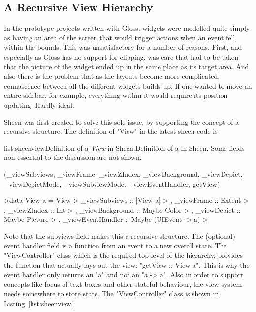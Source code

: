 \subsection{A Recursive View Hierarchy}

In the prototype projects written with Gloss, widgets were modelled quite simply as having an area of the screen that would trigger actions when an event fell within the bounds. This was unsatisfactory  for a number of reasons. First, and especially as Gloss has no support for clipping, was care that had to be taken that the picture of the widget ended up in the same place as its target area. And also there is the problem that as the layouts become more complicated, connascence between all the different widgets builds up. If one wanted to move an entire sidebar, for example, everything within it would require its position updating. Hardly ideal.

Sheen was first created to solve this sole issue, by supporting the concept of a recursive structure. The definition of "View" in the latest sheen code is

\vspace{-0.5em}
\begin{listing}{list:sheenview}{Definition of a \emph{View} in Sheen.}{Definition of a  in Sheen. Some fields non-essential to the discussion are not shown.}{}
\end{listing}\vspace{-1.5em}

\functions(_viewSubviews, _viewFrame, _viewZIndex, _viewBackground, _viewDepict, _viewDepictMode, _viewSubviewMode, _viewEventHandler, getView)
\begin{haskell}

>data View a = View
>  {  _viewSubviews     :: [View a]
>  ,  _viewFrame        :: Extent
>  ,  _viewZIndex       :: Int
>  ,  _viewBackground   :: Maybe Color
>  ,  _viewDepict       :: Maybe Picture
>  ,  _viewEventHandler :: Maybe (UIEvent -> a)
>  }

\end{haskell}
\noindent 
Note that the subviews field makes this a recursive structure. The (optional) event handler field is a function from an event to a new overall state. The "ViewController" class which is the required top level of the hierarchy, provides the function that actually lays out the view: "getView :: View a". This is why the event handler only returns an "a" and not an "a -> a".
Also in order to support concepts like focus of text boxes and other stateful behaviour, the view system needs somewhere to store state. The "ViewController" class is shown in Listing~\ref{list:sheenview}.

